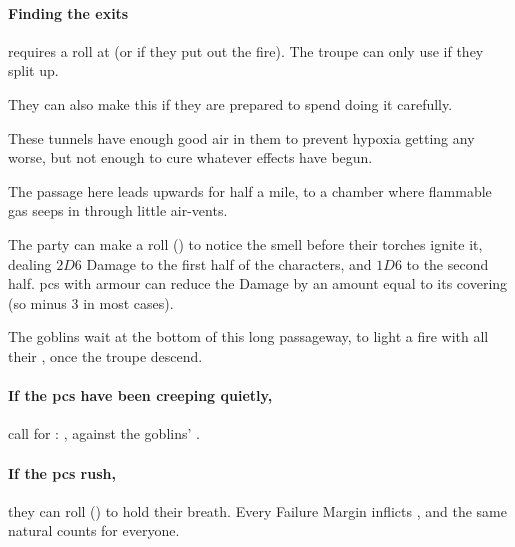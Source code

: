 \begin{multicols}{2}
\paragraph{Finding the exits}
requires a  roll at \tn[9] (or \tn[14] if they put out the fire).
The troupe can only use  if they split up.

They can also make this  if they are prepared to spend  doing it carefully.

These tunnels have enough good air in them to prevent \gls{hypoxia} getting any worse, but not enough to cure whatever effects have begun.




The passage here leads upwards for half a mile, to a chamber where flammable gas seeps in through little air-vents.

The party can make a  roll (\tn[12]) to notice the smell before their torches ignite it, dealing $2D6$ Damage to the first half of the characters, and $1D6$ to the second half.
\Glspl{pc} with armour can reduce the Damage by an amount equal to its \gls{covering} (so minus 3 in most cases).



The goblins wait at the bottom of this long passageway, to light a fire with all their \fireFuel, once the troupe descend.

\paragraph{If the \glspl{pc} have been creeping quietly,}
call for : , against the goblins' .

\paragraph{If the \glspl{pc} rush,}
they can roll  (\tn[10]) to hold their breath.
Every Failure Margin inflicts , and the same \gls{natural} counts for everyone.


\end{multicols}
